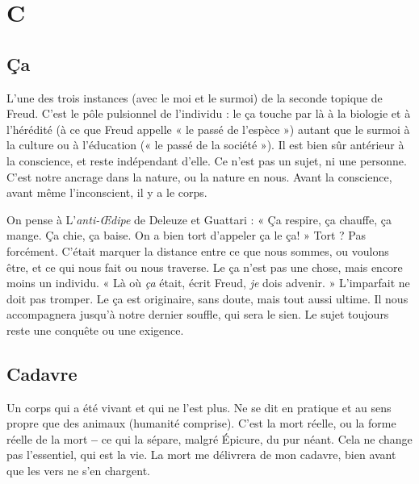 
\chapter{C}

\section{Ça}
L’une des trois instances (avec le moi et le surmoi) de la seconde topique
de Freud. C’est le pôle pulsionnel de l'individu : le ça touche par là à la
biologie et à l’hérédité (à ce que Freud appelle « le passé de l’espèce ») autant
que le surmoi à la culture ou à l'éducation (« le passé de la société »). Il est bien
sûr antérieur à la conscience, et reste indépendant d’elle. Ce n’est pas un sujet,
ni une personne. C’est notre ancrage dans la nature, ou la nature en nous.
Avant la conscience, avant même l’inconscient, il y a le corps.

On pense à L'{\it anti-Œdipe} de Deleuze et Guattari : « Ça respire, ça chauffe,
ça mange. Ça chie, ça baise. On a bien tort d’appeler ça le ça! » Tort ? Pas
forcément. C’était marquer la distance entre ce que nous sommes, ou voulons
être, et ce qui nous fait ou nous traverse. Le ça n’est pas une chose, mais encore
moins un individu. « Là où {\it ça} était, écrit Freud, {\it je} dois advenir. » L’imparfait
ne doit pas tromper. Le ça est originaire, sans doute, mais tout aussi ultime. Il
nous accompagnera jusqu’à notre dernier souffle, qui sera le sien. Le sujet toujours
reste une conquête ou une exigence.

\section{Cadavre}
Un corps qui a été vivant et qui ne l’est plus. Ne se dit en pratique
et au sens propre que des animaux (humanité comprise).
C’est la mort réelle, ou la forme réelle de la mort {\bf --} ce qui la sépare, malgré Épicure,
du pur néant. Cela ne change pas l'essentiel, qui est la vie. La mort me
délivrera de mon cadavre, bien avant que les vers ne s’en chargent.

